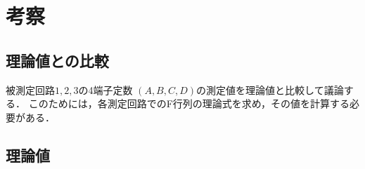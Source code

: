 
\section{考察}
\subsection{理論値との比較}
被測定回路$1,2,3$の4端子定数 $(A, B, C, D)$の測定値を理論値と比較して議論する．
このためには，各測定回路でのF行列の理論式を求め，その値を計算する必要がある．
\subsection*{理論値}
